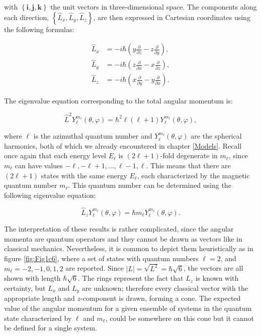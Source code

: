 \documentclass[
  english,
  9pt,
]{extbook}
\theoremstyle{definition}
\theoremstyle{definition}
\theoremstyle{definition}
\theoremstyle{definition}
\theoremstyle{remark}
\begin{document}
with \(\left\{\mathbf{i},\mathbf{j},\mathbf{k}\right\}\) the unit vectors in three-dimensional space. The components along each direction, \(\left\{\hat{L}_x,\hat{L}_y,\hat{L}_z\right\}\), are then expressed in Cartesian coordinates using the following formulas:

\begin{equation}
\begin{aligned}
\hat{L}_x &= -i\hbar\left(y\frac{\partial}{\partial z} - z \frac{\partial}{\partial y} \right), \\
\hat{L}_y &= -i \hbar \left(z\frac{\partial}{\partial x} - x \frac{\partial}{\partial z} \right), \\
\hat{L}_z &= -i \hbar \left(x\frac{\partial}{\partial y} - y \frac{\partial}{\partial x} \right).
\end{aligned}
\label{eq:angmom2}    
\end{equation}

The eigenvalue equation corresponding to the total angular momentum is:

\begin{equation}
\hat{L}^2 Y_{\ell}^{m_{\ell}}(\theta, \varphi) =
\hbar^2 \ell(\ell+1) Y_{\ell}^{m_{\ell}}(\theta, \varphi),
\label{eq:angmom3}
\end{equation}

where \(\ell\) is the azimuthal quantum number and \(Y_{\ell}^{m_\ell}(\theta, \varphi)\) are the spherical harmonics, both of which we already encountered in chapter \ref{Models}. Recall once again that each energy level \(E_{\ell}\) is \((2\ell+1)\)-fold degenerate in \(m_{\ell}\), since \(m_{\ell}\) can have values \(-\ell, -\ell+1, \ldots, \ell-1, \ell\). This means that there are \((2\ell+1)\) states with the same energy \(E_{\ell}\), each characterized by the magnetic quantum number \(m_{\ell}\). This quantum number can be determined using the following eigenvalue equation:

\begin{equation}
\hat{L}_z Y_{\ell}^{m_{\ell}}(\theta, \varphi) =
\hbar m_{\ell} Y_{\ell}^{m_{\ell}}(\theta, \varphi).
\label{eq:angmom4}
\end{equation}

The interpretation of these results is rather complicated, since the angular momenta are quantum operators and they cannot be drawn as vectors like in classical mechanics. Nevertheless, it is common to depict them heuristically as in figure \ref{fig:Fig1c6}, where a set of states with quantum numbers \(\ell =2\), and \(m_{\ell}=-2,-1,0,1,2\) are reported. Since \(|L|={\sqrt {L^{2}}}=\hbar {\sqrt {6}}\), the vectors are all shown with length \(\hbar \sqrt{6}\). The rings represent the fact that \(L_{z}\) is known with certainty, but \(L_{x}\) and \(L_{y}\) are unknown; therefore every classical vector with the appropriate length and \(z\)-component is drawn, forming a cone. The expected value of the angular momentum for a given ensemble of systems in the quantum state characterized by \(\ell\) and \(m_{\ell}\), could be somewhere on this cone but it cannot be defined for a single system.
\end{document}

